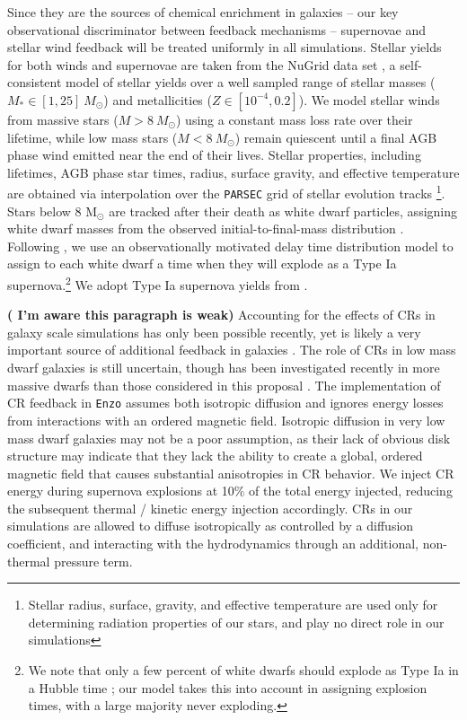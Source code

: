 \documentclass[11pt]{article}
\newcommand{\eg}{e.g.,}
\begin{document}
Since they are the sources of chemical enrichment in galaxies -- our key observational discriminator between feedback mechanisms -- supernovae and stellar wind feedback will be treated uniformly in all simulations. Stellar yields for both winds and supernovae are taken from the NuGrid data set \citep[][, Ritter et. al. in prep]{Pignatari2016}, a self-consistent model of stellar yields over a well sampled range of stellar masses ($M_{*} \in [1,25]~M_{\odot}$) and metallicities ($Z\in [10^{-4},0.2]$). We model stellar winds from massive stars ($M > 8~M_{\odot}$) using a constant mass loss rate over their lifetime, while low mass stars ($M < 8~M_{\odot}$) remain quiescent until a final AGB phase wind emitted near the end of their lives. Stellar properties, including lifetimes, AGB phase star times, radius, surface gravity, and effective temperature are obtained via interpolation over the \texttt{PARSEC} grid of stellar evolution tracks \citep{Bressan2012}\footnote{Stellar radius, surface, gravity, and effective temperature are used only for determining radiation properties of our stars, and play no direct role in our simulations}. Stars below 8 M$_{\odot}$ are tracked after their death as white dwarf particles, assigning white dwarf masses from the observed initial-to-final-mass distribution \citep{Salaris2009}. Following \citep{Cote2015}, we use an observationally motivated delay time distribution model \citep[\eg][]{Maoz2014} to assign to each white dwarf a time when they will explode as a Type Ia supernova.\footnote{We note that only a few percent of white dwarfs should explode as Type Ia in a Hubble time \citep{Maoz2014}; our model takes this into account in assigning explosion times, with a large majority never exploding.} We adopt Type Ia supernova yields from \cite{Thielemann1986}.

{\bf \tiny ( I'm aware this paragraph is weak)} Accounting for the effects of CRs in galaxy scale simulations has only been possible recently, yet is likely a very important source of additional feedback in galaxies \citep[\eg][]{SalemBryan2014, SalemBryanHummels, SalemBryanCorlies, GirichidisCR, Pakmor2016, Simpson2016}. The role of CRs in low mass dwarf galaxies is still uncertain, though has been investigated recently in more massive dwarfs than those considered in this proposal \citep{Chen2016}. The implementation of CR feedback in \texttt{Enzo} \citep{SalemBryan2014} assumes both isotropic diffusion and ignores energy losses from interactions with an ordered magnetic field. Isotropic diffusion in very low mass dwarf galaxies may not be a poor assumption, as their lack of obvious disk structure may indicate that they lack the ability to create a global, ordered magnetic field that causes substantial anisotropies in CR behavior. We inject CR energy during supernova explosions at 10\% of the total energy injected, reducing the subsequent thermal / kinetic energy injection accordingly. CRs in our simulations are allowed to diffuse isotropically as controlled by a diffusion coefficient, and interacting with the hydrodynamics through an additional, non-thermal pressure term.
\end{document}
